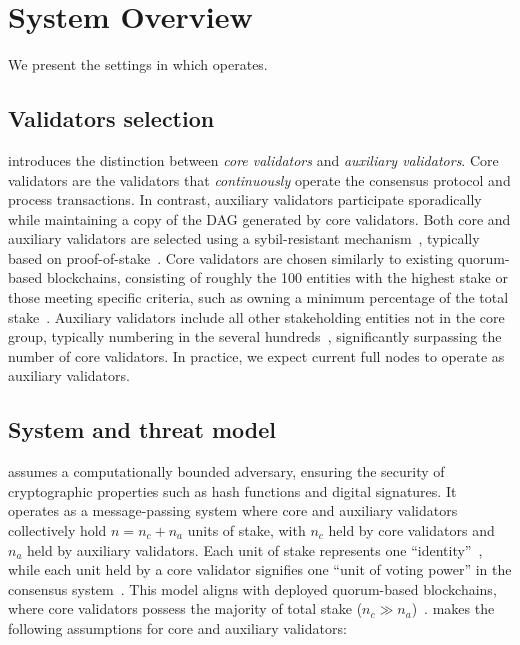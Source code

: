 \section{System Overview} \label{sec:overview}

We present the settings in which \sysname operates.

\subsection{Validators selection} \label{sec:validators}
\sysname introduces the distinction between \emph{core validators} and \emph{auxiliary validators}. Core validators are the validators that \emph{continuously} operate the consensus protocol and process transactions. In contrast, auxiliary validators participate sporadically while maintaining a copy of the DAG generated by core validators.
Both core and auxiliary validators are selected using a sybil-resistant mechanism~\cite{douceur2002sybil}, typically based on proof-of-stake~\cite{kucci2021proof}. Core validators are chosen similarly to existing quorum-based blockchains, consisting of roughly the 100 entities with the highest stake or those meeting specific criteria, such as owning a minimum percentage of the total stake~\cite{sui}.  Auxiliary validators include all other stakeholding entities not in the core group, typically numbering in the several hundreds~\cite{sui-scan}, significantly surpassing the number of core validators.  In practice, we expect current full nodes to operate as auxiliary validators.

\subsection{System and threat model} \label{sec:model}
\sysname assumes a computationally bounded adversary, ensuring the security of cryptographic properties such as hash functions and digital signatures. It operates as a message-passing system where core and auxiliary validators collectively hold  $n = n_c + n_a$ units of stake, with $n_c$ held by core validators and $n_a$ held by auxiliary validators. Each unit of stake represents one ``identity''~\cite{douceur2002sybil}, while each unit held by a core validator signifies one ``unit of voting power'' in the consensus system~\cite{sui-code,sui}. This model aligns with deployed quorum-based blockchains, where core validators possess the majority of total stake ($n_c \gg n_a$)~\cite{sui,aptos,solana}. \sysname makes the following assumptions for core and auxiliary validators:

